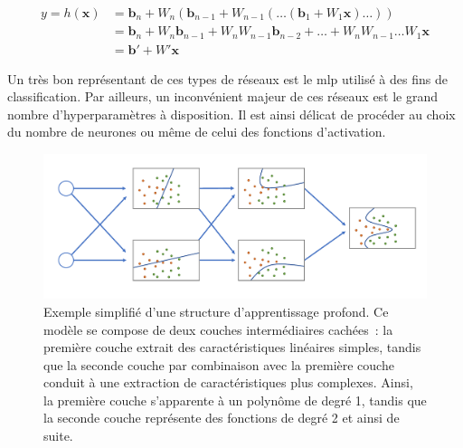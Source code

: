 \begin{equation} 
    \label{eq:proof_linearity}
    \begin{split}
        y = h(\mathbf{x})   &=\mathbf{b}_n+W_n(\mathbf{b}_{n-1}+W_{n-1}(\dots (\mathbf{b}_1+W_1 \mathbf{x})\dots))\\
                            &=\mathbf{b}_n+W_n\mathbf{b}_{n-1}+W_nW_{n-1}\mathbf{b}_{n-2}+\dots+W_nW_{n-1}\dots W_1\mathbf{x}\\
                            &=\mathbf{b}'+W'\mathbf{x}
    \end{split}
\end{equation}\par

\addtocounter{footnote}{1}

Un très bon représentant de ces types de réseaux est le \gls{mlp} utilisé à des fins de classification. Par ailleurs, un inconvénient majeur de ces réseaux est le grand nombre d'hyperparamètres à disposition. Il est ainsi délicat de procéder au choix du nombre de neurones ou même de celui des fonctions d'activation.\par

\begin{figure}[H]
    \centering
    \includegraphics[width=\linewidth]{contents/chapter_3/resources/scheme_deep_understanding.pdf}
    \caption{Exemple simplifié d'une structure d’apprentissage profond. Ce modèle se compose de deux couches intermédiaires cachées~: la première couche extrait des caractéristiques linéaires simples, tandis que la seconde couche par combinaison avec la première couche conduit à une extraction de caractéristiques plus complexes. Ainsi, la première couche s'apparente à un polynôme de degré 1, tandis que la seconde couche représente des fonctions de degré 2 et ainsi de suite.}
    \label{fig:scheme_deep_understanding}
\end{figure}

